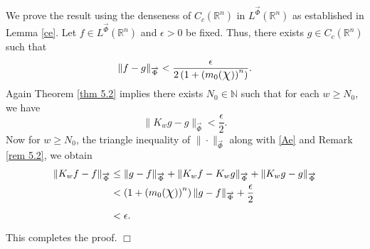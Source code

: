 \documentclass[11pt, a4paper]{article}
\theoremstyle{definition}
\newcommand{\qedwhite}{\hfill \ensuremath{\Box}}
\renewenvironment{proof}{{\raggedright \bfseries Proof.}}{\qedwhite}
\numberwithin{equation}{section}
\def\NN{\mathbb N}
\def\RR{\mathbb R}
\def\Chi{\mbox{\Large$\chi$}}
\newcommand{\priyanka}[1]{{\color{blue}{[PM: #1]}}}
\newcommand{\dlp}[1]{{\color{red}{[DP: #1]}}}
\newcommand{\vc}[1]{\overrightarrow{#1}}
\begin{document}
    \begin{proof}
We prove the result using the denseness of $ C_{c}(\RR^{n})$ in $L^{\overrightarrow{\Phi}}(\RR^{n})$ as established in Lemma \ref{ce}. Let $f\in L^{\overrightarrow{\Phi}}(\RR^{n})$ and $\epsilon >0$ be fixed. 
Thus, there exists $g \in C_{c}(\RR^{n})$ such that 
\begin{equation}\label{Ae}
\|f-g\|_{\overrightarrow{\Phi}} <\frac{\epsilon}{2 \left( 1+\left(m_0(\Chi)\right)^n\right) }.
\end{equation}
 Again Theorem \ref{thm 5.2} implies there exists $N_0\in \NN$ such that for each $w\geq N_0$, we have $$\|K_wg-g\|_{\vc{\Phi}}<\frac{\epsilon}{2}.$$
Now for $w\geq N_0$, the triangle inequality of $ \|\cdot\|_{\overrightarrow{\Phi}}$ along with \eqref{Ae} and Remark \ref{rem 5.2}, we obtain
	\begin{align*}
			\| K_wf-f\|_{\overrightarrow{\Phi}} &\leq \|g-f\|_{  \overrightarrow{\Phi}}+ \|K_wf-K_wg\|_{\vc{\Phi}}+ \|K_wg-g\|_{\vc{\Phi}}\\
			&<  \left( 1+\left(m_0(\Chi)\right)^n\right) \|g-f\|_{  \overrightarrow{\Phi}} + \frac{\epsilon}{2}\\
			&<\epsilon.
	\end{align*}
	This completes the proof.
\end{proof}
\end{document}
